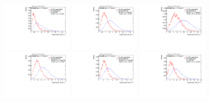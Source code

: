 \begin{figure}[H]
\bigskip
\includegraphics[width=0.3\textwidth]{sascha_input/Appendix/Distributions/w/distributions/beta17/h_recoJet_D2_17_bin1.pdf} \hspace{1mm}
\includegraphics[width=0.3\textwidth]{sascha_input/Appendix/Distributions/w/distributions/beta17/h_recoJet_D2_17_bin2.pdf} \hspace{1mm}
\includegraphics[width=0.3\textwidth]{sascha_input/Appendix/Distributions/w/distributions/beta17/h_recoJet_D2_17_bin3.pdf} 
\bigskip
\includegraphics[width=0.3\textwidth]{sascha_input/Appendix/Distributions/w/distributions/beta17/h_recoJet_D2_17_bin4.pdf} \hspace{1mm}
\includegraphics[width=0.3\textwidth]{sascha_input/Appendix/Distributions/w/distributions/beta17/h_recoJet_D2_17_bin5.pdf} \hspace{1mm}
\includegraphics[width=0.3\textwidth]{sascha_input/Appendix/Distributions/w/distributions/beta17/h_recoJet_D2_17_bin6.pdf}

\end{figure}

